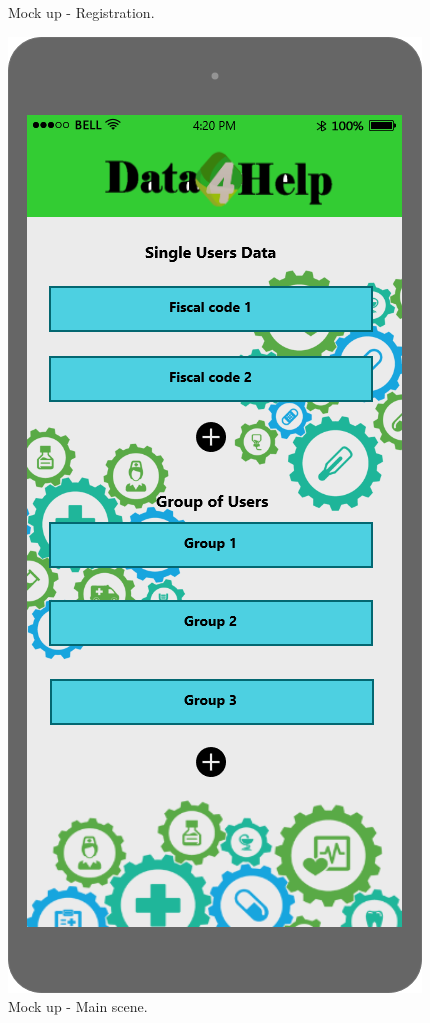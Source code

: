 \begin{figure}[h!]
\begin{minipage}[b]{0.25\textwidth}
    		\caption{Mock up - Registration.}
	\end{minipage}
	\hfill
 	\begin{minipage}[b]{0.25\textwidth}
    		\includegraphics[width=\textwidth]{./pictures/main_scene.png}
    		\caption{Mock up - Main scene.}
	\end{minipage}
\end{figure}
 
